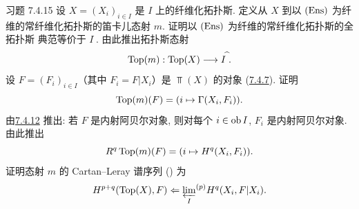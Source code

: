 \begin{enonce*}[remark]{习题 7.4.15}
设 $X=(X_i)_{i\in I}$ 是 $I$ 上的纤维化拓扑斯.
定义从 $X$ 到以 $(\operatorname{Ens})$ 为纤维的常纤维化拓扑斯的笛卡儿态射 $m$.
证明以 $(\operatorname{Ens})$ 为纤维的常纤维化拓扑斯的全拓扑斯
典范等价于 $I^{\widehat{\phantom{,}}}$.
由此推出拓扑斯态射
$$
\Top(m) :\Top(X) \to I^{\widehat{\phantom{,}}}{\quoi}.
$$
设 $F=(F_i)_{i\in I}$（其中 $F_i=F|X_i$）是 $\Top(X)$ 的对象
(\hyperref[VI.prop7.4.7]{7.4.7}). 证明
$$
\operatorname{Top}(m)(F) = (i \mapsto \Gamma (X_i, F_i)){}.
$$
由\hyperref[VI.lem7.4.12]{7.4.12} 推出:
若 $F$ 是内射阿贝尔对象, 则对每个 $i\in\operatorname{ob} I$, $F_i$ 是内射阿贝尔对象.
由此推出
$$
R^q \operatorname{Top}(m)(F) = (i \mapsto H^{q} (X_i, F_i)){}.
$$
证明\pageoriginale 态射 $m$ 的 Cartan--Leray 谱序列
() 为
$$
H^{p+q} (\operatorname{Top}(X), F) \Leftarrow {\varprojlim_{I}}^{(p)} H^{q}
(X_i, F|X_i){}.
$$
\end{enonce*}




